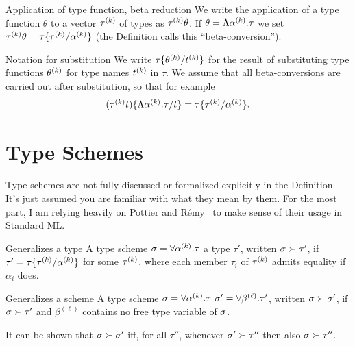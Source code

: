 \begin{clause}{Application of type function, beta reduction}
We write the application of a type function $\theta$ to a vector
$\mbox{$\tau^{(k)}$}$ of types as $\mbox{$\tau^{(k)}$}\theta$.
If $\theta=\Lambda\mbox{$\alpha^{(k)}$}.\tau$ we set $\mbox{$\tau^{(k)}$}\theta=\tau\{\mbox{$\tau^{(k)}$}/\mbox{$\alpha^{(k)}$}\}$
(the Definition calls this ``beta-conversion''). 
\end{clause}

\begin{convention}{Notation for substitution}
We write $\tau\{\mbox{$\theta^{(k)}$}/\mbox{$t^{(k)}$}\}$ for the result of substituting type
functions $\mbox{$\theta^{(k)}$}$ for type names $\mbox{$t^{(k)}$}$ in $\tau$.
We assume that all beta-conversions
are carried out after substitution, so that for example
\begin{equation*}
(\mbox{$\tau^{(k)}$}t)\{\Lambda\mbox{$\alpha^{(k)}$}.\tau/t\}=\tau\{\mbox{$\tau^{(k)}$}/\mbox{$\alpha^{(k)}$}\}.
\end{equation*}
\end{convention}

\section{Type Schemes}

\begin{ddanger}
Type schemes are not fully discussed or formalized explicitly in the
Definition. It's just assumed you are familiar with what they mean by
them. For the most part, I am relying heavily on Pottier and
R{\'e}my~\cite{pottier2005essence} to make sense of their usage in
Standard ML.
\end{ddanger}

\begin{definition}{Generalizes a type}
A type scheme $\sigma=\forall\mbox{$\alpha^{(k)}$}.\tau$  a type
$\tau'$, written $\sigma \succ\tau'$, if $\tau'=\tau\{\mbox{$\tau^{(k)}$}/\mbox{$\alpha^{(k)}$}\}$
for some $\mbox{$\tau^{(k)}$}$, where each member $\tau_i$ of $\mbox{$\tau^{(k)}$}$ admits equality
if $\alpha_i$ does.
\end{definition}

\begin{definition}{Generalizes a scheme}
A type scheme $\sigma=\forall\mbox{$\alpha^{(k)}$}.\tau$  $\sigma'=\forall\beta^{(\ell)}.\tau'$,
written $\sigma\succ\sigma'$, if $\sigma\succ\tau'$ and $\beta^{(\ell)}$ contains
no free type variable of $\sigma$.

It can be shown that $\sigma\succ\sigma'$ iff, for all $\tau''$, whenever
$\sigma'\succ\tau''$ then also $\sigma\succ\tau''$.
\end{definition}

